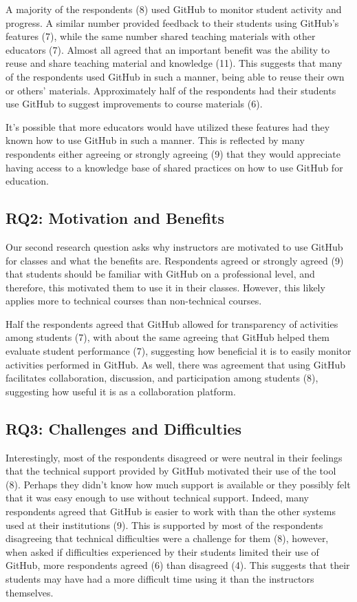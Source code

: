 A majority of the respondents (8) used GitHub to monitor student activity and progress. A similar number provided feedback to their students using GitHub's features (7), while the same number shared teaching materials with other educators (7). Almost all agreed that an important benefit was the ability to reuse and share teaching material and knowledge (11). This suggests that many of the respondents used GitHub in such a manner, being able to reuse their own or others' materials. Approximately half of the respondents had their students use GitHub to suggest improvements to course materials (6).

It's possible that more educators would have utilized these features had they known how to use GitHub in such a manner. This is reflected by many respondents either agreeing or strongly agreeing (9) that they would appreciate having access to a knowledge base of shared practices on how to use GitHub for education.

\subsection{RQ2: Motivation and Benefits}
Our second research question asks why instructors are motivated to use GitHub for classes and what the benefits are. Respondents agreed or strongly agreed (9) that students should be familiar with GitHub on a professional level, and therefore, this motivated them to use it in their classes. However, this likely applies more to technical courses than non-technical courses.

Half the respondents agreed that GitHub allowed for transparency of activities among students (7), with about the same agreeing that GitHub helped them evaluate student performance (7), suggesting how beneficial it is to easily monitor activities performed in GitHub. As well, there was agreement that using GitHub facilitates collaboration, discussion, and participation among students (8), suggesting how useful it is as a collaboration platform.

\subsection{RQ3: Challenges and Difficulties}
Interestingly, most of the respondents disagreed or were neutral in their feelings that the technical support provided by GitHub motivated their use of the tool (8). Perhaps they didn't know how much support is available or they possibly felt that it was easy enough to use without technical support. Indeed, many respondents agreed that GitHub is easier to work with than the other systems used at their institutions (9). This is supported by most of the respondents disagreeing that technical difficulties were a challenge for them (8), however, when asked if difficulties experienced by their students limited their use of GitHub, more respondents agreed (6) than disagreed (4). This suggests that their students may have had a more difficult time using it than the instructors themselves.

